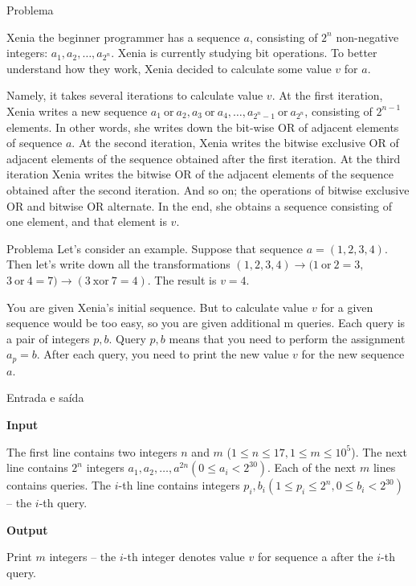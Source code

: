 
\begin{frame}[fragile]{Problema}

Xenia the beginner programmer has a sequence $a$, consisting of $2^n$ non-negative integers: 
$a_1, a_2, \ldots, a_{2^n}$. Xenia is currently studying bit operations. To better understand how 
they work, Xenia decided to calculate some value $v$ for $a$.

Namely, it takes several iterations to calculate value $v$. At the first iteration, Xenia writes 
a new sequence $a_1\ \mbox{or}\ a_2, a_3\ \mbox{or}\ a_4, \ldots, a_{2^n - 1}\ \mbox{or}\ a_{2^n}$, consisting of $2^{n - 1}$
elements. In other words, she writes down the bit-wise OR of adjacent elements of sequence $a$. At 
the second iteration, Xenia writes the bitwise exclusive OR of adjacent elements of the sequence 
obtained after the first iteration. At the third iteration Xenia writes the bitwise OR of the 
adjacent elements of the sequence obtained after the second iteration. And so on; the operations 
of bitwise exclusive OR and bitwise OR alternate. In the end, she obtains a sequence consisting of 
one element, and that element is $v$.
\end{frame}

\begin{frame}[fragile]{Problema}
Let's consider an example. Suppose that sequence $a = (1, 2, 3, 4)$. Then let's write down all the 
transformations $(1, 2, 3, 4) \to (1\ \mbox{or}\ 2 = 3,$ $3\ \mbox{or}\ 4 = 7) \to (3\ \mbox{xor}\ 
7 = 4)$. The result is $v = 4$.

You are given Xenia's initial sequence. But to calculate value $v$ for a given sequence would be 
too easy, so you are given additional m queries. Each query is a pair of integers $p, b$. Query 
$p, b$ means that you need to perform the assignment $a_p = b$. After each query, you need to 
print the new value $v$ for the new sequence $a$.
\end{frame}


\begin{frame}[fragile]{Entrada e saída}

\textbf{Input}

The first line contains two integers $n$ and $m$ ($1\leq n\leq 17, 1\leq m\leq 10^5$). The next 
line contains $2^n$ integers $a_1, a_2, \ldots, a^{2n} (0\leq a_i < 2^{30})$. Each of the next 
$m$ lines contains queries. The $i$-th line contains integers $p_i, b_i (1\leq p_i\leq 2^n, 0 \leq 
b_i < 2^{30})$ -- the $i$-th query.

\vspace{0.2in}

\textbf{Output}

Print $m$ integers -- the $i$-th integer denotes value $v$ for sequence a after the $i$-th query.

\end{frame}


